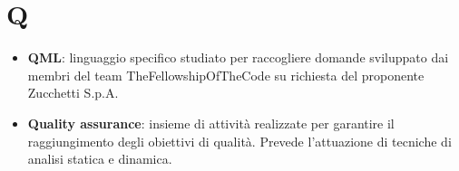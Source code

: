 \section{Q}
\begin{itemize}
	\item
	\textbf{QML}: linguaggio specifico studiato per raccogliere domande sviluppato dai membri del team TheFellowshipOfTheCode su richiesta del proponente Zucchetti S.p.A.
	\item
	\textbf{Quality assurance}: insieme di attività realizzate per garantire il raggiungimento degli obiettivi di qualità. Prevede l'attuazione di tecniche di analisi statica e dinamica.	
\end{itemize}